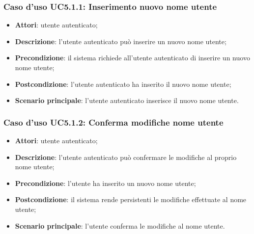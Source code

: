 \subsubsection{Caso d'uso UC5.1.1: Inserimento nuovo nome utente}

\begin{itemize}
	\item \textbf{Attori}: utente autenticato;
	\item \textbf{Descrizione}: l'utente autenticato può inserire un nuovo nome utente;
	\item \textbf{Precondizione}: il sistema richiede all'utente autenticato di inserire un nuovo nome utente;
	\item \textbf{Postcondizione}: l'utente autenticato ha inserito il nuovo nome utente;
	\item \textbf{Scenario principale}: l'utente autenticato inserisce il nuovo nome utente.
\end{itemize}

\subsubsection{Caso d'uso UC5.1.2: Conferma modifiche nome utente}

\begin{itemize}
	\item \textbf{Attori}: utente autenticato;
	\item \textbf{Descrizione}: l'utente autenticato può confermare le modifiche al proprio nome utente;
	\item \textbf{Precondizione}: l'utente ha inserito un nuovo nome utente;
	\item \textbf{Postcondizione}: il sistema rende persistenti le modifiche effettuate al nome utente;
	\item \textbf{Scenario principale}: l'utente conferma le modifiche al nome utente.
\end{itemize}

